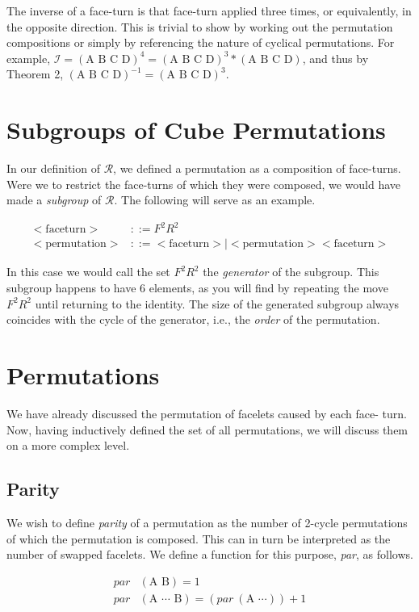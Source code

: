 \documentclass{article}
\begin{document}
The inverse of a face-turn is that face-turn applied three times, or 
equivalently, in the opposite direction. This is trivial to show by working 
out the permutation compositions or simply by referencing the nature of 
cyclical permutations. For example, 
$\mathcal{I} = (\text{A B C D})^4 = (\text{A B C D})^3 * (\text{A B C D})$, 
and thus by Theorem 2, $(\text{A B C D})^{-1} = (\text{A B C D})^3$.

\section{Subgroups of Cube Permutations}
In our definition of $\mathcal{R}$, we defined a permutation as a composition 
of face-turns. Were we to restrict the face-turns of which they were 
composed, we would have made a \emph{subgroup} of $\mathcal{R}$. The 
following will serve as an example.

\begin{align*}
	< \text{faceturn}>  & ::= F^2R^2
\\	< \text{permutation}>  &::= < \text{faceturn}>  | < \text{permutation}> < \text{faceturn}> 
\end{align*}

In this case we would call the set ${F^2R^2}$ the \emph{generator} of the 
subgroup. This subgroup happens to have 6 elements, as you will find by 
repeating the move $F^2R^2$ until returning to the identity. The size of the 
generated subgroup always coincides with the cycle of the generator, i.e., 
the \emph{order} of the permutation.


\section{Permutations}
We have already discussed the permutation of facelets caused by each face-
turn. Now, having inductively defined the set of all permutations, we will 
discuss them on a more complex level.

\subsection{Parity}
We wish to define \emph{parity} of a permutation as the number of 2-cycle 
permutations of which the permutation is composed. This can in turn be 
interpreted as the number of swapped facelets. We define a function for this 
purpose, \emph{par}, as follows.

\begin{align*}
	par &(\text{A B}) = 1
\\	par &(\text{A } \cdots \text{ B}) = (par\ (\text{A } \cdots)) + 1
\end{align*}
\end{document}
